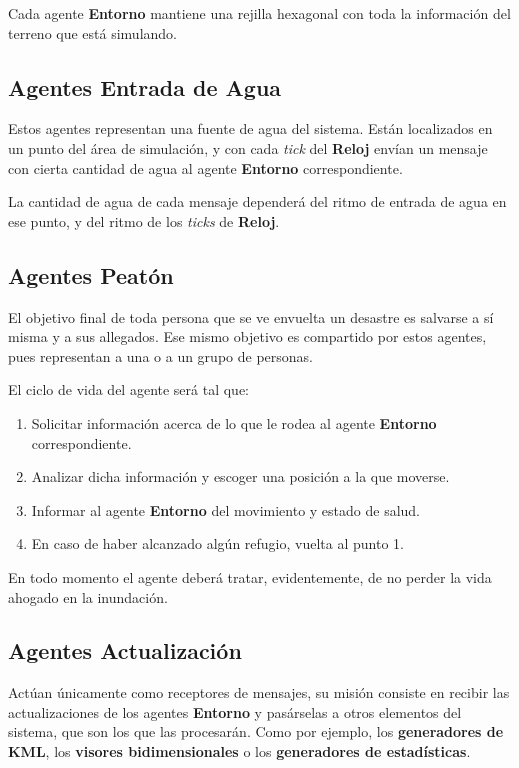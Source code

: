 Cada agente {\bf Entorno} mantiene una rejilla hexagonal con toda la
información del terreno que está simulando.

\subsection{Agentes Entrada de Agua}

Estos agentes representan una fuente de agua del sistema. Están localizados en
un punto del área de simulación, y con cada {\em tick} del {\bf Reloj} envían
un mensaje con cierta cantidad de agua al agente {\bf Entorno} correspondiente.

La cantidad de agua de cada mensaje dependerá del ritmo de entrada de agua en
ese punto, y del ritmo de los {\em ticks} de {\bf Reloj}.

\subsection{Agentes Peatón}

El objetivo final de toda persona que se ve envuelta un desastre es salvarse a
sí misma y a sus allegados. Ese mismo objetivo es compartido por estos agentes,
pues representan a una o a un grupo de personas.

El ciclo de vida del agente será tal que:

\begin{enumerate}
 \item Solicitar información acerca de lo que le rodea al agente {\bf
Entorno} correspondiente.
 \item Analizar dicha información y escoger una posición a la que moverse.
 \item Informar al agente {\bf Entorno} del movimiento y estado de salud.
 \item En caso de haber alcanzado algún refugio, vuelta al punto 1.
\end{enumerate}

En todo momento el agente deberá tratar, evidentemente, de no perder la vida
ahogado en la inundación.

\subsection{Agentes Actualización}

Actúan únicamente como receptores de mensajes, su misión consiste en recibir
las actualizaciones de los agentes {\bf Entorno} y pasárselas a otros elementos
del sistema, que son los que las procesarán. Como por ejemplo, los {\bf
generadores de KML}, los {\bf visores bidimensionales} o los {\bf generadores de
estadísticas}.

